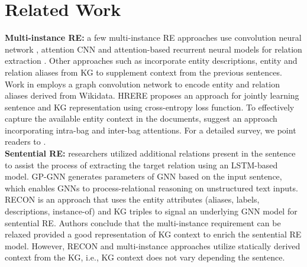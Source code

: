 \documentclass[11pt,a4paper]{article}
\begin{document}
\section{Related Work} \label{sec:related}
\textbf{Multi-instance RE:} a few multi-instance RE approaches use convolution neural network \cite{dos2015classifying}, attention CNN \cite{wang2016relation} and attention-based recurrent neural models for relation extraction \cite{zhou2016attention}. Other approaches such as \cite{DBLP:conf/aaai/Ji0H017,DBLP:conf/emnlp/VashishthJPBT18} incorporate entity descriptions, entity and relation aliases from KG to supplement context from the previous sentences. Work in \cite{DBLP:conf/emnlp/VashishthJPBT18} employs a graph convolution network to encode entity and relation aliases derived from Wikidata. HRERE \cite{DBLP:conf/naacl/XuB19} proposes an approach for jointly learning sentence and KG representation using cross-entropy loss function. To effectively capture the available entity context in the documents,  \citet{DBLP:conf/naacl/YeL19} suggest an approach incorporating intra-bag and inter-bag attentions.
For a detailed survey, we point readers to \cite{smirnova2018relation}.\\
\textbf{Sentential RE:} researchers \cite{DBLP:conf/emnlp/SorokinG17} utilized additional relations present in the sentence to assist the process of extracting the target relation using an LSTM-based model. GP-GNN \cite{DBLP:conf/acl/ZhuLLFCS19} generates parameters of GNN based on the input sentence, which enables GNNs to process-relational reasoning
on unstructured text inputs. RECON \cite{bastos2020recon} is an approach that uses the entity attributes (aliases, labels, descriptions, instance-of) and KG triples to signal an underlying GNN model for sentential RE. 
Authors conclude that the multi-instance requirement can be relaxed provided a good representation of KG context to enrich the sentential RE model. However, RECON and multi-instance approaches \cite{DBLP:conf/naacl/XuB19,DBLP:conf/emnlp/VashishthJPBT18} utilize statically derived context from the KG, i.e., KG context does not vary depending the sentence.
\end{document}
